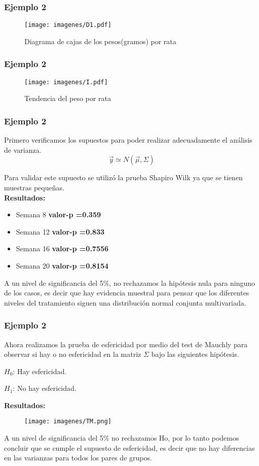 \documentclass[12pt]{beamer}
\begin{document}
\begin{frame}
\frametitle{Ejemplo 2}
\begin{figure}[h!]
\caption{Diagrama de cajas de los pesos(gramos) por rata}
  \centering
  \texttt{[image: imagenes/D1.pdf]}
\end{figure}
\end{frame}

\begin{frame}
\frametitle{Ejemplo 2}
\begin{figure}[h!]
\caption{Tendencia del peso por rata}
  \centering
  \texttt{[image: imagenes/I.pdf]}
\end{figure}
\end{frame}

\begin{frame}
\frametitle{Ejemplo 2}
Primero verificamos los supuestos para poder realizar adecuadamente el análisis de varianza. 
$$\vec{y} \simeq N(\vec{\mu},\Sigma)$$

Para validar este supuesto se utilizó la prueba Shapiro Wilk ya que se tienen muestras pequeñas.
~\\\textbf{Resultados:}
\begin{itemize}
\item[]Semana 8 \textbf{valor-p =0.359}
\item[]Semana 12 \textbf{valor-p =0.833}
\item[]Semana 16 \textbf{valor-p =0.7556}
\item[]Semana 20 \textbf{valor-p =0.8154}
\end{itemize}
A un nivel de significancia del 5\%, no rechazamos la hipótesis nula para ninguno de los casos, es
decir que hay evidencia muestral para pensar que los diferentes niveles del tratamiento siguen una distribución normal conjunta multivariada.
\end{frame}

\begin{frame}
\frametitle{Ejemplo 2}
Ahora realizamos la prueba de esfericidad por medio del test de Mauchly para observar si hay o no
esfericidad en la matriz $\Sigma$ bajo las siguientes hipótesis.
\begin{center}
$H_0$: Hay esfericidad.

$H_1$: No hay esfericidad.
\end{center}
\textbf{Resultados:}
\begin{figure}[h!]
  \centering
  \texttt{[image: imagenes/TM.png]}
\end{figure}
A un nivel de significancia del 5\% no rechazamos Ho, por lo tanto podemos concluir que se cumple
el supuesto de esfericidad, es decir que no hay diferencias en las varianzas para todos los pares
de grupos.
\end{frame}
\end{document}
